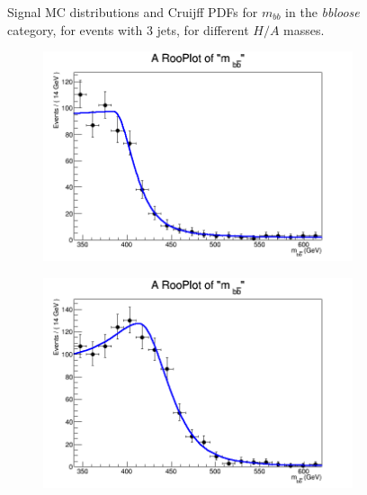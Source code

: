 \begin{figure}[phtb!]
\begin{center}
  \caption{Signal MC distributions and Cruijff PDFs for $m_{bb}$ in the {\it bbloose} category, for events with 3 jets, for different $H/A$ masses. \label{fig:signalPDFs_3j_bbloose}}
    \end{center}
\end{figure}


\begin{figure}[phtb!]
  \begin{center}
  \begin{subfigure}[$m_{A}=400$ GeV]{0.4\textwidth}\includegraphics[width=\textwidth]{FitResults/images/fitMC_bAbb400_5.png}\end{subfigure}
  \begin{subfigure}[$m_{A}=450$ GeV]{0.4\textwidth}\includegraphics[width=\textwidth]{FitResults/images/fitMC_bAbb450_5.png}\end{subfigure}

\end{center}
\end{figure}
